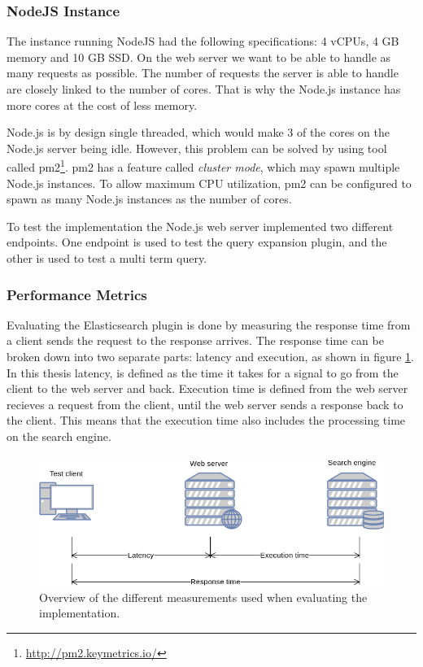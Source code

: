 \subsubsection{NodeJS Instance}
The instance running NodeJS had the following specifications: 4 vCPUs, 4 GB memory and 10 GB SSD.
On the web server we want to be able to handle as many requests as possible.
The number of requests the server is able to handle are closely linked to the number of cores.
That is why the Node.js instance has more cores at the cost of less memory.

Node.js is by design single threaded, which would make 3 of the cores on the Node.js server being idle.
However, this problem can be solved by using tool called pm2\footnote{\url{http://pm2.keymetrics.io/}}.
pm2 has a feature called \textit{cluster mode}, which may spawn multiple Node.js instances.
To allow maximum CPU utilization, pm2 can be configured to spawn as many Node.js instances as the number of cores.

To test the implementation the Node.js web server implemented two different endpoints.
One endpoint is used to test the query expansion plugin,
and the other is used to test a multi term query.

\subsubsection{Performance Metrics}
Evaluating the Elasticsearch plugin is done by measuring the response time from a client sends the request to the response arrives.
The response time can be broken down into two separate parts: latency and execution, as shown in figure \ref{fig:latency-measurements}.
In this thesis latency, is defined as the time it takes for a signal to go from the client to the web server and back.
Execution time is defined from the web server recieves a request from the client, until the web server sends a response back to the client.
This means that the execution time also includes the processing time on the search engine.


\begin{figure}[h!]
  \centering \includegraphics[width=0.9\linewidth]{img/latency-measurements.png}
  \caption{Overview of the different measurements used when evaluating the implementation.}
  \label{fig:latency-measurements}
\end{figure}
